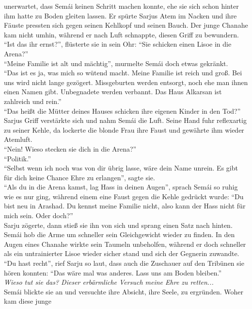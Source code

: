 unerwartet, dass Semái keinen Schritt machen konnte, ehe sie sich schon hinter ihm hatte zu Boden 
gleiten lassen. Er spürte Sarjus Atem im Nacken und ihre Fäuste pressten sich gegen seinen Kehlkopf 
und seinen Bauch. Der junge Chanahe kam nicht umhin, während er nach Luft schnappte, diesen Griff 
zu bewundern.\\
``Ist das ihr ernst?'', flüsterte sie in sein Ohr: ``Sie schicken einen Lisoe in die Arena?''\\
``Meine Familie ist alt und mächtig'', murmelte Semái doch etwas gekränkt.\\
``Das ist es ja, was mich so wütend macht. Meine Familie ist reich und groß. Bei uns wird nicht 
lange gezögert. Missgeburten werden entsorgt, noch ehe man ihnen einen Namen gibt. Unbegnadete 
werden verbannt. Das Haus Alkarsan ist zahlreich und rein.''\\
``Das heißt die Mütter deines Hauses schicken ihre eigenen Kinder in den Tod?''\\
Sarjus Griff verstärkte sich und nahm Semái die Luft. Seine Hand fuhr reflexartig zu seiner Kehle, 
da lockerte die blonde Frau ihre Faust und gewährte ihm wieder Atemluft. \\
``Nein! Wieso stecken sie dich in die Arena?''\\
``Politik.''\\
``Selbst wenn ich noch was von dir übrig lasse, wäre dein Name unrein. Es gibt für dich keine 
Chance Ehre zu erlangen'', sagte sie.\\
``Als du in die Arena kamst, lag Hass in deinen Augen'', sprach Semái so ruhig wie es nur ging, 
während einem eine Faust gegen die Kehle gedrückt wurde: ``Du bist neu in Arashad. Du kennst meine 
Familie nicht, also kann der Hass nicht für mich sein. Oder doch?''\\
Sarju zögerte, dann stieß sie ihn von sich und sprang einen Satz nach hinten. Semái hob die Arme um 
schneller sein Gleichgewicht wieder zu finden. In den Augen eines Chanahe wirkte sein Taumeln 
unbeholfen, während er doch schneller als ein untrainierter Lisoe wieder sicher stand und sich der 
Gegnerin zuwandte. \\
``Du hast recht'', rief Sarju so laut, dass auch die Zuschauer auf den Tribünen sie hören konnten: 
``Das wäre mal was anderes. Lass uns am Boden bleiben.''\\
\textit{Wieso tut sie das? Dieser erbärmliche Versuch meine Ehre zu retten... }\\
Semái blickte sie an und versuchte ihre Absicht, ihre Seele, zu ergründen. Woher kam diese junge 

